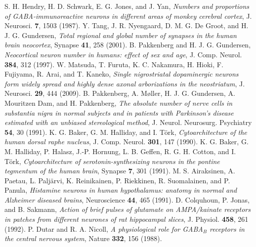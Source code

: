  S. H. Hendry, H. D. Schwark, E. G. Jones, and J. Yan, \emph{Numbers and proportions of GABA-immunoreactive neurons in different areas of monkey cerebral cortex}, J. Neurosci. \textbf{7}, 1503 (1987).
 Y. Tang, J. R. Nyengaard, D. M. G. De Groot, and H. J. G. Gundersen, \emph{Total regional and global number of synapses in the human brain neocortex}, Synapse \textbf{41}, 258 (2001).
 B. Pakkenberg and H. J. G. Gundersen, \emph{Neocortical neuron number in humans: effect of sex and age}, J. Comp. Neurol. \textbf{384}, 312 (1997).
 W. Matsuda, T. Furuta, K. C. Nakamura, H. Hioki, F. Fujiyama, R. Arai, and T. Kaneko, \emph{Single nigrostriatal dopaminergic neurons form widely spread and highly dense axonal arborizations in the neostriatum}, J. Neurosci. \textbf{29}, 444 (2009).
 B. Pakkenberg, A. M{\o}ller, H. J. G. Gundersen, A. Mouritzen Dam, and H. Pakkenberg, \emph{The absolute number of nerve cells in substantia nigra in normal subjects and in patients with Parkinson's disease estimated with an unbiased stereological method}, J. Neurol. Neurosurg. Psychiatry \textbf{54}, 30 (1991).
 K. G. Baker, G. M. Halliday, and I. T\"ork, \emph{Cytoarchitecture of the human dorsal raphe nucleus}, J. Comp. Neurol. \textbf{301}, 147 (1990).
 K. G. Baker, G. M. Halliday, P. Halasz, J.-P. Hornung, L. B. Geffen, R. G. H. Cotton, and I. T\"ork, \emph{Cytoarchitecture of serotonin-synthesizing neurons in the pontine tegmentum of the human brain}, Synapse \textbf{7}, 301 (1991).
 M. S. Airaksinen, A. Paetau, L. Palj\"arvi, K. Reinikainen, P. Riekkinen, R. Suomalainen, and P. Panula, \emph{Histamine neurons in human hypothalamus: anatomy in normal and Alzheimer diseased brains}, Neuroscience \textbf{44}, 465 (1991).
 D. Colquhoun, P. Jonas, and B. Sakmann, \emph{Action of brief pulses of glutamate on AMPA/kainate receptors in patches from different neurones of rat hippocampal slices}, J. Physiol. \textbf{458}, 261 (1992).
 P. Dutar and R. A. Nicoll, \emph{A physiological role for GABA$_B$ receptors in the central nervous system}, Nature \textbf{332}, 156 (1988).
